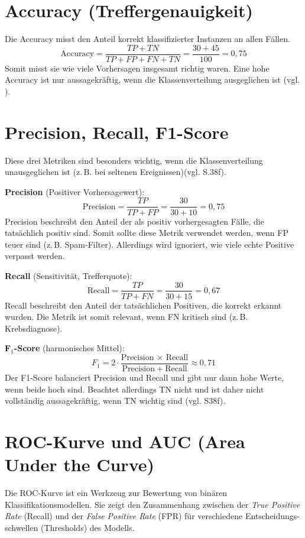 \section{Accuracy (Treffergenauigkeit)}
Die Accuracy misst den Anteil korrekt klassifizierter Instanzen an allen Fällen.  
\[
\mathrm{Accuracy}=\frac{TP+TN}{TP+FP+FN+TN} = \frac{30+45}{100} = 0{,}75
\]
Somit misst sie wie viele Vorhersagen insgesamt richtig waren.
Eine hohe Accuracy ist nur aussagekräftig, wenn die Klassenverteilung ausgeglichen ist (vgl. \cite{Miller2024}).

\section{Precision, Recall, F1-Score}
Diese drei Metriken sind besonders wichtig, wenn die Klassenverteilung unausgeglichen ist (z.\,B. bei seltenen Ereignissen)(vgl. \cite{powers2020evaluation} S.38f).

\textbf{Precision} (Positiver Vorhersagewert):
\[
\mathrm{Precision} = \frac{TP}{TP+FP} = \frac{30}{30+10} = 0{,}75
\]
Precision beschreibt den Anteil der als positiv vorhergesagten Fälle, die tatsächlich positiv sind.  
Somit sollte diese Metrik verwendet werden, wenn \ac{FP} teuer sind (z.\,B. Spam‑Filter).  
Allerdings wird ignoriert, wie viele echte Positive verpasst werden.

\textbf{Recall} (Sensitivität, Trefferquote):
\[
\mathrm{Recall} = \frac{TP}{TP+FN} = \frac{30}{30+15} = 0{,}67
\]
Recall beschreibt den Anteil der tatsächlichen Positiven, die korrekt erkannt wurden.  
Die Metrik ist somit relevant, wenn \ac{FN} kritisch sind (z.\,B. Krebsdiagnose).  

\textbf{F\(_1\)-Score} (harmonisches Mittel):
\[
F_1 = 2 \cdot \frac{\mathrm{Precision}\,\times\,\mathrm{Recall}}{\mathrm{Precision} + \mathrm{Recall}}
\approx 0{,}71
\]
Der F1-Score balanciert Precision und Recall und gibt nur dann hohe Werte, wenn beide hoch sind.  
Beachtet allerdings \ac{TN} nicht und ist daher nicht vollständig aussagekräftig, wenn TN wichtig sind (vgl. \cite{powers2020evaluation} S38f).

\section{ROC-Kurve und AUC (Area Under the Curve)}
Die \ac{ROC}-Kurve ist ein Werkzeug zur Bewertung von binären
Klassifikationsmodellen. Sie zeigt den Zusammenhang zwischen der \emph{True
Positive Rate} (Recall) und der \emph{False Positive Rate} (FPR) für
verschiedene Entscheidungs­schwellen (Thresholds) des Modells.

